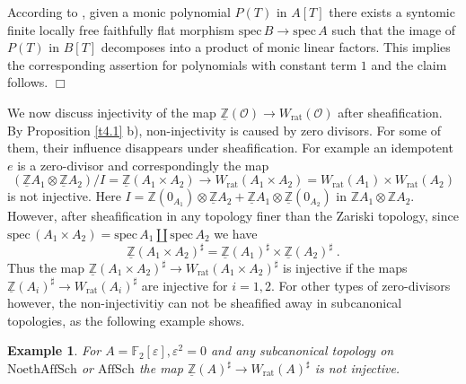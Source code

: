 \documentclass[12pt,leqno]{article}
\newcommand{\F}{{\mathbb{F}}}
\newcommand{\Z}{{\mathbb{Z}}}
\newcommand{\uZ}{\underline{\Z}}
\newcommand{\NAS}{\mathrm{NoethAffSch}}
\newcommand{\AS}{\mathrm{AffSch}}
\newcommand{\spec}{\mathrm{spec}\,}
\newcommand{\rat}{\mathrm{rat}}
\newcommand{\Oh}{{\mathcal O}}
\newtheorem{example}[theorem]{Example}
\newenvironment{proof}{\noindent {\bf Proof}}{\mbox{}\hspace*{\fill}$\Box$}
\begin{document}
\begin{proof}
According to \cite[Lemma 10.136.14]{stacks}, given a monic polynomial $P (T)$ in $A [T]$ there exists a syntomic finite locally free faithfully flat morphism $\spec B \to \spec A$ such that the image of $P (T)$ in $B [T]$ decomposes into a product of monic linear factors. This implies the corresponding assertion for polynomials with constant term $1$ and the claim follows. 
\end{proof}

We now discuss injectivity of the map $\uZ (\Oh) \to W_{\rat} (\Oh)$ after sheafification. By Proposition \ref{t4.1} b), non-injectivity is caused by zero divisors. For some of them, their influence disappears under sheafification. For example an idempotent $e$ is a zero-divisor and correspondingly the map
\[
(\uZ A_1 \otimes \uZ A_2) / I = \uZ (A_1 \times A_2) \longrightarrow W_{\rat} (A_1 \times A_2) = W_{\rat} (A_1) \times W_{\rat} (A_2)
\]
is not injective. Here $I = \Z (0_{A_1}) \otimes \uZ A_2 + \uZ A_1 \otimes \uZ (0_{A_2})$ in $\Z A_1 \otimes \Z A_2$. However, after sheafification in any topology finer than the Zariski topology, since $\spec (A_1 \times A_2) = \spec A_1 \amalg \spec A_2$ we have
\[
\uZ (A_1 \times A_2)^{\sharp} = \uZ (A_1)^{\sharp} \times \uZ (A_2)^{\sharp} \; .
\]
Thus the map $\uZ (A_1 \times A_2)^{\sharp} \to W_{\rat} (A_1 \times A_2)^{\sharp}$ is injective if the maps $\uZ (A_i)^{\sharp} \to W_{\rat} (A_i)^{\sharp}$ are injective for $i = 1,2$. For other types of zero-divisors however, the non-injectivitiy can not be sheafified away in subcanonical topologies, as the following example shows.

\begin{example} 
\label{t4.4}
For $A = \F_2 [\varepsilon] , \varepsilon^2 = 0$ and any subcanonical topology on $\NAS$ or $\AS$ the map $\uZ (A)^{\sharp} \to W_{\rat} (A)^{\sharp}$ is not injective.
\end{example}
\end{document}
